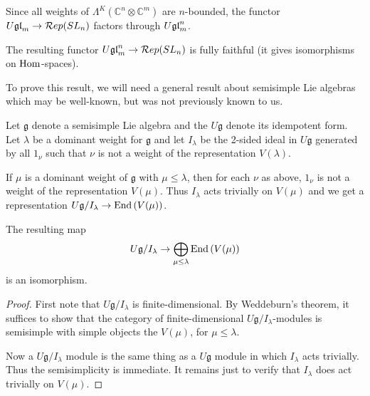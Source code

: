 \documentclass[11pt,leqno]{article}
\begin{document}
Since all weights of $ \Lambda^K(\mathbb{C}^n \otimes \mathbb{C}^m) $ are $ n$-bounded, the functor $ U\mathfrak{gl}_{m} \rightarrow \mathcal{R}ep(SL_{n}) $ factors through $ U\mathfrak{gl}_{m}^n $.

\begin{thm} \label{th:functorfullyfaithful}
The resulting functor $ U\mathfrak{gl}_{m}^n \rightarrow \mathcal{R}ep(SL_{n})$ is fully faithful (it gives isomorphisms on $\operatorname{Hom}$-spaces).
\end{thm}

To prove this result, we will need a general result about semisimple Lie algebras which may be well-known, but was not previously known to us.

Let $ \mathfrak g $ denote a semisimple Lie algebra and the $ U \mathfrak g $ denote its idempotent form.  Let $ \lambda $ be a dominant weight for $ \mathfrak g $ and let $ I_\lambda $ be the 2-sided ideal in $ U\mathfrak g $ generated by all $ 1_\nu $ such that $ \nu $ is not a weight of the representation $ V(\lambda) $.

If $ \mu $ is a dominant weight of $ \mathfrak g $ with $ \mu \le \lambda $, then for each $ \nu $ as above, $ 1_\nu $ is not a weight of the representation $ V(\mu)$.  Thus $ I_\lambda $ acts trivially on $ V(\mu) $ and we get a representation $ U \mathfrak g / I_\lambda \rightarrow \operatorname{End}\left(V(\mu)\right) $.

\begin{lem}
The resulting map
$$
U \mathfrak g / I_\lambda \rightarrow \bigoplus_{\mu \le \lambda} \operatorname{End}\left( V(\mu)\right)
$$
is an isomorphism.
\end{lem}

\begin{proof}
First note that $U \mathfrak g/ I_\lambda $ is finite-dimensional.  By Weddeburn's theorem, it suffices to show that the category of finite-dimensional $ U\mathfrak g / I_\lambda $-modules is semisimple with simple objects the $ V(\mu) $, for $ \mu \le \lambda $.

Now a $ U\mathfrak g / I_\lambda$ module is the same thing as a $ U\mathfrak g $ module in which $ I_\lambda $ acts trivially.  Thus the semisimplicity is immediate.  It remains just to verify that $ I_\lambda $ does act trivially on $ V(\mu)$.

\end{proof}
\end{document}
